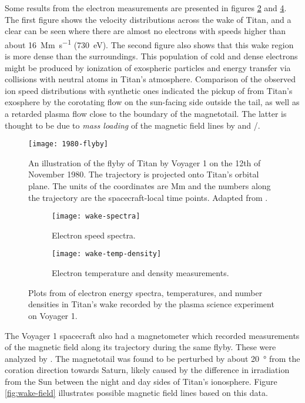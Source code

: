 \documentclass[12pt, parskip=full*, abstract]{scrartcl}
\begin{document}
Some results from the electron measurements are presented in figures \ref{fig:wake-spectra} and \ref{fig:wake-temp-density}. The first figure shows the velocity distributions across the wake of Titan, and a clear  can be seen where there are almost no electrons with speeds higher than about \SI{16}{\mega\metre\per\second} (\SI{730}{\electronvolt}). The second figure also shows that this wake region is more dense than the surroundings. This population of cold and dense electrons might be produced by ionization of exospheric particles and energy transfer via collisions with neutral atoms in Titan's atmosphere. Comparison of the observed ion speed distributions with synthetic ones indicated the pickup of  from Titan's exosphere by the corotating flow on the sun-facing side outside the tail, as well as a retarded plasma flow close to the boundary of the magnetotail. The latter is thought to be due to \textit{mass loading} of the magnetic field lines by  and /.

\begin{figure}[htbp]
	\centering
	\texttt{[image: 1980-flyby]}
	\caption{An illustration of the flyby of Titan by Voyager 1 on the 12th of November 1980. The trajectory is projected onto Titan's orbital plane. The units of the coordinates are \si{\mega\metre} and the numbers along the trajectory are the spacecraft-local time points. Adapted from \textcite{hartle-1982}.}
	\label{fig:1980-flyby}
\end{figure}


\begin{figure}[htbp]
	\begin{subfigure}{\textwidth}
		\centering
		\texttt{[image: wake-spectra]}
		\caption{Electron speed spectra.}
		\label{fig:wake-spectra}	
	\end{subfigure}
	\begin{subfigure}{\textwidth}
		\centering
		\texttt{[image: wake-temp-density]}
		\caption{Electron temperature and density measurements.}
		\label{fig:wake-temp-density}
	\end{subfigure}
	\caption{Plots from \textcite{hartle-1982} of electron energy spectra, temperatures, and number densities in Titan's wake recorded by the plasma science experiment on Voyager 1.}
\end{figure}

The Voyager 1 spacecraft also had a magnetometer which recorded measurements of the magnetic field along its trajectory during the same flyby. These were analyzed by \textcite{ness-1982}. The magnetotail was found to be perturbed by about \SI{20}{\degree} from the coration direction towards Saturn, likely caused by the difference in irradiation from the Sun between the night and day sides of Titan's ionosphere. Figure \ref{fig:wake-field} illustrates possible magnetic field lines based on this data.
\end{document}
